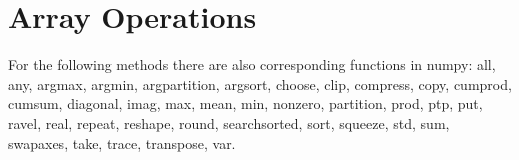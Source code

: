 \documentclass[numpymain.tex]{subfiles}
\begin{document}

\section{Array Operations}


For the following methods there are also corresponding functions in numpy: all, any, argmax, argmin, argpartition, argsort, choose, clip, compress, copy, cumprod, cumsum, diagonal, imag, max, mean, min, nonzero, partition, prod, ptp, put, ravel, real, repeat, reshape, round, searchsorted, sort, squeeze, std, sum, swapaxes, take, trace, transpose, var.
\end{document}
